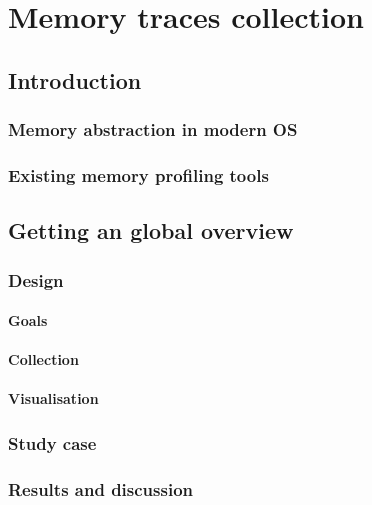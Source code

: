 \chapter{Memory traces collection}

\section{Introduction}

\subsection{Memory abstraction in modern OS}


\subsection{Existing memory profiling tools}


\section{Getting an global overview}


\subsection{Design}

\subsubsection{Goals}

\subsubsection{Collection}

\subsubsection{Visualisation}

\subsection{Study case}

\subsection{Results and discussion}



